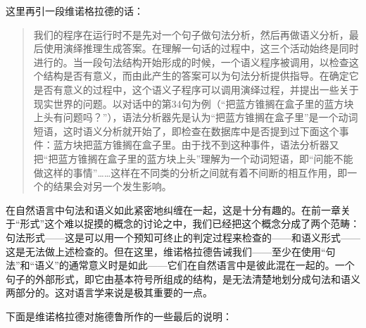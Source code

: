 这里再引一段维诺格拉德的话：

\begin{quote}
我们的程序在运行时不是先对一个句子做句法分析，然后再做语义分析，最后使用演绎推理生成答案。在理解一句话的过程中，这三个活动始终是同时进行的。当一段句法结构开始形成的时候，一个语义程序被调用，以检查这个结构是否有意义，而由此产生的答案可以为句法分析提供指导。在确定它是否有意义的过程中，这个语义子程序可以调用演绎过程，并提出一些关于现实世界的问题。以对话中的第34句为例（“把蓝方锥搁在盒子里的蓝方块上头有问题吗？”），语法分析器先是认为“把蓝方锥搁在盒子里”是一个动词短语，这时语义分析就开始了，即检查在数据库中是否提到过下面这个事件：蓝方块把蓝方锥搁在盒子里。由于找不到这种事件，语法分析器又把“把蓝方锥搁在盒子里的蓝方块上头”理解为一个动词短语，即“问能不能做这样的事情”……这样在不同类的分析之间就有着不间断的相互作用，即一个的结果会对另一个发生影响。
\end{quote}

在自然语言中句法和语义如此紧密地纠缠在一起，这是十分有趣的。在前一章关于“形式”这个难以捉摸的概念的讨论之中，我们已经把这个概念分成了两个范畴：句法形式——这是可以用一个预知可终止的判定过程来检查的——和语义形式——这是无法做上述检查的。但在这里，维诺格拉德告诫我们——至少在使用“句法”和“语义”的通常意义时是如此——它们在自然语言中是彼此混在一起的。一个句子的外部形式，即它由基本符号所组成的结构，是无法清楚地划分成句法和语义两部分的。这对语言学来说是极其重要的一点。

下面是维诺格拉德对施德鲁所作的一些最后的说明：


